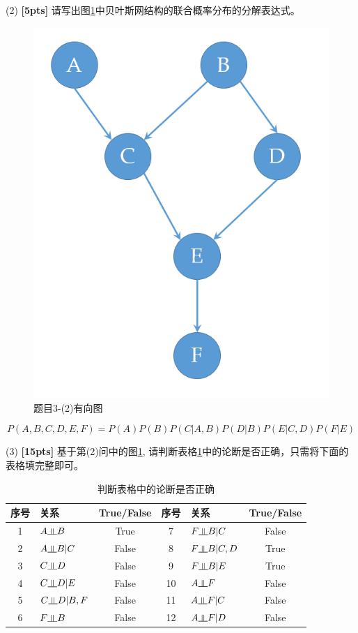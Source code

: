 \documentclass[a4paper,UTF8]{article}
\numberwithin{equation}{section}
\theoremstyle{definition}
\newcommand{\indep}{\rotatebox[origin=c]{90}{$\models$}}
\begin{document}
(2) \textbf{[5pts]} 请写出图\ref{fig-DAG}中贝叶斯网结构的联合概率分布的分解表达式。
\begin{figure}[h]
\label{fig-DAG}
\centering
\includegraphics[scale=0.3]{bayes_net.png}
\caption{题目3-(2)有向图}
\end{figure}
\begin{equation*}
P(A, B, C, D, E, F) = P(A)P(B)P(C|A,B)P(D|B)P(E|C,D)P(F|E)
\end{equation*}

(3) \textbf{[15pts]} 基于第(2)问中的图\ref{fig-DAG}, 请判断表格\ref{table:DAG}中的论断是否正确，只需将下面的表格填完整即可。
\begin{table}[h]
\centering
\caption{判断表格中的论断是否正确}
\label{table:DAG}
\begin{tabular}{c|l|c||c|l|c}\hline
序号   		& 		关系  			& True/False 	& 序号   	& 		关系  			& True/False \\ \hline
1			&	$A \indep B$ 		    & 		True	    & 7  		& 	$F \indep B|C$ 		& 	False		 \\
2			&	$A \indep B|C$ 	    & 		False	    & 8  		& 	$F \indep B|C, D$ 	& 	True		 \\
3			&	$C \indep D $		    & 		False	    & 9  		& 	$F \indep B|E$ 		& 		True	 \\
4			&	$C \indep D|E$ 	    & 		False	    & 10  		& 	$A \indep F $			& 		False	 \\
5			&	$C \indep D|B, F$     & 		False	    & 11  		& 	$A \indep F|C$ 		& 	False		 \\
6			&	$F \indep B $		    & 		False	    & 12  		& 	$A \indep F|D$ 		& 	False		 \\ \hline
\end{tabular}
\end{table}
~\\
\end{document}
